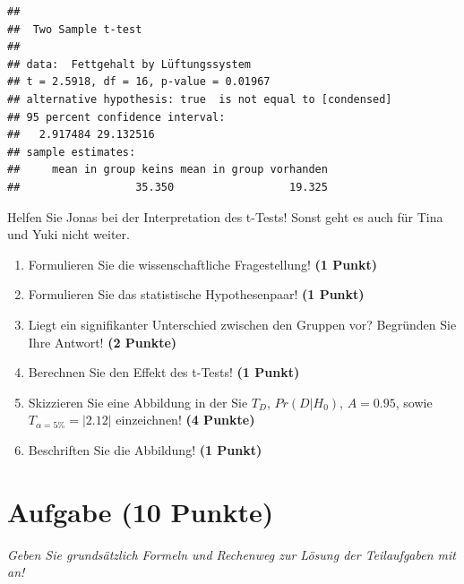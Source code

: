 \documentclass[a4paper, 9pt]{scrartcl}\usepackage[]{graphicx}\usepackage[]{xcolor}
\makeatletter
\newenvironment{kframe}{%
 \def\at@end@of@kframe{}%
 \ifinner\ifhmode%
  \def\at@end@of@kframe{\end{minipage}}%
  \begin{minipage}{\columnwidth}%
 \fi\fi%
 \def\FrameCommand##1{\hskip\@totalleftmargin \hskip-\fboxsep
 \colorbox{shadecolor}{##1}\hskip-\fboxsep
     \hskip-\linewidth \hskip-\@totalleftmargin \hskip\columnwidth}%
 \MakeFramed {\advance\hsize-\width
   \@totalleftmargin\z@ \linewidth\hsize
   \@setminipage}}%
 {\par\unskip\endMakeFramed%
 \at@end@of@kframe}
\newenvironment{knitrout}{}{} %
\makeatother
\begin{document}
\begin{knitrout}
\color{fgcolor}\begin{kframe}
\begin{verbatim}
## 
## 	Two Sample t-test
## 
## data:  Fettgehalt by Lüftungssystem
## t = 2.5918, df = 16, p-value = 0.01967
## alternative hypothesis: true  is not equal to [condensed]
## 95 percent confidence interval:
##   2.917484 29.132516
## sample estimates:
##     mean in group keins mean in group vorhanden 
##                  35.350                  19.325
\end{verbatim}
\end{kframe}
\end{knitrout}

Helfen Sie Jonas bei der Interpretation des t-Tests! Sonst geht es auch für Tina und Yuki nicht weiter.
  
\begin{enumerate}
  \item Formulieren Sie die wissenschaftliche Fragestellung! \textbf{(1 Punkt)}
  \item Formulieren Sie das statistische Hypothesenpaar! \textbf{(1 Punkt)}
\item Liegt ein signifikanter Unterschied zwischen den Gruppen vor? Begründen Sie Ihre Antwort! \textbf{(2 Punkte)}
\item Berechnen Sie den Effekt des t-Tests! \textbf{(1 Punkt)}
\item Skizzieren Sie eine Abbildung in der Sie $T_{D}$, $Pr(D|H_0)$, $A=0.95$, sowie $T_{\alpha=5\%} = |2.12|$ einzeichnen! \textbf{(4 Punkte)}
\item Beschriften Sie die Abbildung! \textbf{(1 Punkt)}  
\end{enumerate} 
\clearpage

\section{Aufgabe \hfill (10 Punkte)}

\textit{Geben Sie grundsätzlich Formeln und Rechenweg zur Lösung der Teilaufgaben mit an!} \\[1Ex]
 
\end{document}
